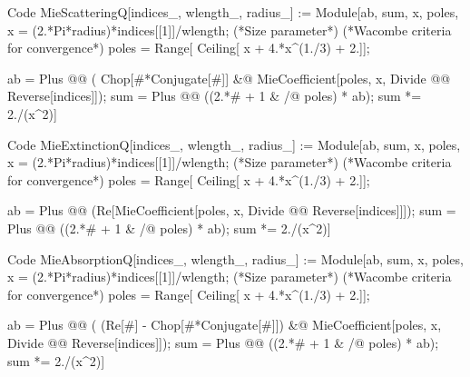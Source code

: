{\footnotesize
\begin{mmaCell}[
	pattern = {indices_, wlength_, radius_, indices, wlength, radius, \#},
	local = {ab, sum, x, poles}
	]{Code}
  MieScatteringQ[indices_, wlength_, radius_] :=
   Module[{ab, sum, x, poles},
    x = (2.*Pi*radius)*indices[[1]]/wlength; (*Size parameter*)
    (*Wacombe criteria for convergence*)
    poles = Range[ Ceiling[ x + 4.*x^(1./3) + 2.]];

    ab = Plus @@ ( Chop[#*Conjugate[#]] &@
    		 MieCoefficient[poles, x, Divide @@ Reverse[indices]]);
    sum = Plus @@ ((2.*# + 1 & /@ poles) * ab);
   sum *= 2./(x^2)]
\end{mmaCell}
}

{\footnotesize
\begin{mmaCell}[
	pattern = {indices_, wlength_, radius_, indices, wlength, radius, \#},
	local = {ab, sum, x, poles}
	]{Code}
  MieExtinctionQ[indices_, wlength_, radius_] :=
   Module[{ab, sum, x, poles},
    x = (2.*Pi*radius)*indices[[1]]/wlength; (*Size parameter*)
    (*Wacombe criteria for convergence*)
    poles = Range[ Ceiling[ x + 4.*x^(1./3) + 2.]];

    ab = Plus @@ (Re[MieCoefficient[poles, x, Divide @@ Reverse[indices]]]);
    sum = Plus @@ ((2.*# + 1 & /@ poles) * ab);
   sum *= 2./(x^2)]
\end{mmaCell}
}

{\footnotesize
\begin{mmaCell}[
	pattern = {indices_, wlength_, radius_, indices, wlength, radius, \#},
	local = {ab, sum, x, poles}
	]{Code}
  MieAbsorptionQ[indices_, wlength_, radius_] :=
   Module[{ab, sum, x, poles},
    x = (2.*Pi*radius)*indices[[1]]/wlength; (*Size parameter*)
    (*Wacombe criteria for convergence*)
    poles = Range[ Ceiling[ x + 4.*x^(1./3) + 2.]];

    ab = Plus @@ ( (Re[#] - Chop[#*Conjugate[#]]) &@
    		  MieCoefficient[poles, x, Divide @@ Reverse[indices]]);
    sum = Plus @@ ((2.*# + 1 & /@ poles) * ab);
   sum *= 2./(x^2)]
\end{mmaCell}
}

